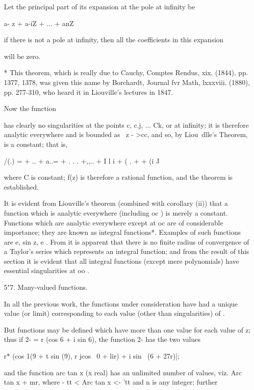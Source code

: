 {{{{Let the principal part of its expansion at the pole at infinity be

a- z + a-iZ + ... + anZ \

if there is not a pole at infinity, then all the coefficients in this
expansion

will be zero.

* This theorem, which is really due to Cauchy, Comptes Rendus, xix.
(1844), pp. 1377, 1378, was given this name by Borchardt, Journal fvr
Math, lxxxviii. (1880), pp. 277-310, who heard it in Liouville's
lectures in 1847.

%
%

Now the function

has clearly no singularities at the points c, c.j, ... Ck, or at
infinity; it is therefore analytic everywhere and is bounded as \ z -
>cc, and so, by Liou\ dlle's Theorem, is a constant; that is,

/(.) = + .. + a..= + . . . +,,.. + I l i + ( . +   + (i J 

where C is constant; f(z) is therefore a rational function, and the
theorem is established.

It is evident from Liouville's theorem (combined with
 corollary (ii)) that a function which is
analytic everywhere (including oc ) is merely a constant. Functions
which are analytic everywhere except at oc are of considerable
importance; they are known as integral functions*. Examples of such
functions are e, sin z, e . From it is apparent
that there is no finite radius of convergence of a Taylor's series
which represents an integral function; and from the result of this
section it is evident that all integral functions (except mere
polynomials) have essential singularities at oo .

5"7. Many-valued functions.

In all the previous work, the functions under consideration have had a
unique value (or limit) corresponding to each value (other than
singularities) of .

But functions may be defined which have more than one value for each
value of z; thus if 2- = r (cos 6 + i sin 6), the function 2- has the
two values

r* (cos 1(9 + t sin (9), r jcos \ 0 + lir) + i sin \ (6 + 27r)|;

and the function arc tan x (x real) has an unlimited number of values,
viz. Arc tan x + mr, where - tt < Arc tan x <- 'tt and n is any
integer; further

}}}}
